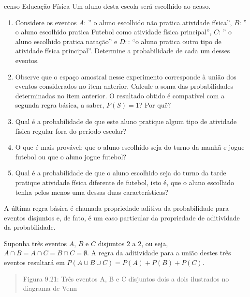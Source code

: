 \begin{task}{censo Educação Física}
Um aluno desta escola será escolhido ao acaso.
\begin{enumerate}
\item {} 
Considere os eventos \(A\):  ” o aluno escolhido não pratica atividade física”, \(B\): ” o aluno escolhido pratica Futebol como atividade física principal”, \(C\): ” o aluno escolhido pratica natação” e \(D:\): “o aluno pratica outro tipo de atividade física principal”. Determine a probabilidade de cada um desses eventos.

\item {} 
Observe que o espaço amostral nesse experimento corresponde à união dos eventos considerados no item anterior. Calcule a soma das probabilidades determinadas no item anterior. O resultado obtido é compatível com a segunda regra básica, a saber, \(P(S)=1\)? Por quê?

\item {} 
Qual é a probabilidade de que este aluno pratique algum tipo de atividade física regular fora do período escolar?

\item {} 
O que é mais provável: que o aluno escolhido seja do turno da manhã e jogue futebol ou que o aluno jogue futebol?

\item {} 
Qual é a probabilidade de que o aluno escolhido seja do turno da tarde  pratique atividade física diferente de futebol, isto é, que o aluno escolhido tenha pelos menos uma dessas duas características?

\end{enumerate}
\end{task}


\label{\detokenize{PE511-4:sec-organizando-propriedades}}\label{\detokenize{PE511-4::doc}}\label{\detokenize{PE511-4:organizando-probabilidade-regras-basicas-e-propriedades}}
A última regra básica é chamada propriedade aditiva da probabilidade para eventos disjuntos e, de fato, é um caso particular da propriedade de aditividade da probabilidade.

Suponha três eventos \(A\), \(B\) e \(C\) disjuntos 2 a 2, ou seja, \(A\cap B=A\cap C=B\cap C=\emptyset\). A regra da aditividade para a união destes três eventos resultará em \(P(A\cup B\cup C)=P(A)+P(B)+P(C)\).
\begin{quote}
\begin{center}\end{center}
Figura 9.21: Três eventos A, B e C disjuntos dois a dois ilustrados no diagrama de Venn
\end{quote}

